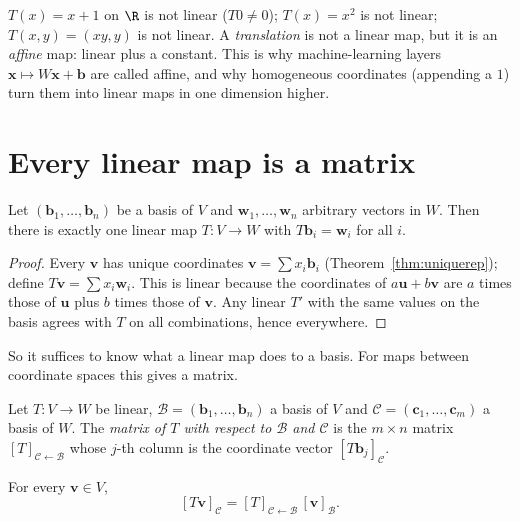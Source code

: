 \begin{example}
$T(x)=x+1$ on $\R$ is not linear ($T0\ne0$); $T(x)=x^2$ is not linear; $T(x,y)=(xy,y)$ is not linear. A \emph{translation} is not a linear map, but it is an \emph{affine} map: linear plus a constant. This is why machine-learning layers $\mathbf{x}\mapsto W\mathbf{x}+\mathbf{b}$ are called affine, and why homogeneous coordinates (appending a $1$) turn them into linear maps in one dimension higher.
\end{example}

\section{Every linear map is a matrix}

\begin{theorem}\label{thm:linbasis}
Let $(\mathbf{b}_1,\dots,\mathbf{b}_n)$ be a basis of $V$ and $\mathbf{w}_1,\dots,\mathbf{w}_n$ arbitrary vectors in $W$. Then there is exactly one linear map $T:V\to W$ with $T\mathbf{b}_i=\mathbf{w}_i$ for all $i$.
\end{theorem}

\begin{proof}
Every $\mathbf{v}$ has unique coordinates $\mathbf{v}=\sum x_i\mathbf{b}_i$ (Theorem~\ref{thm:uniquerep}); define $T\mathbf{v}=\sum x_i\mathbf{w}_i$. This is linear because the coordinates of $a\mathbf{u}+b\mathbf{v}$ are $a$ times those of $\mathbf{u}$ plus $b$ times those of $\mathbf{v}$. Any linear $T'$ with the same values on the basis agrees with $T$ on all combinations, hence everywhere.
\end{proof}

So it suffices to know what a linear map does to a basis. For maps between coordinate spaces this gives a matrix.

\begin{definition}
Let $T:V\to W$ be linear, $\mathcal{B}=(\mathbf{b}_1,\dots,\mathbf{b}_n)$ a basis of $V$ and $\mathcal{C}=(\mathbf{c}_1,\dots,\mathbf{c}_m)$ a basis of $W$. The \emph{matrix of $T$ with respect to $\mathcal{B}$ and $\mathcal{C}$} is the $m\times n$ matrix $[T]_{\mathcal{C}\leftarrow\mathcal{B}}$ whose $j$-th column is the coordinate vector $[T\mathbf{b}_j]_{\mathcal{C}}$.
\end{definition}

\begin{theorem}\label{thm:matrixrep}
For every $\mathbf{v}\in V$,
\[ [T\mathbf{v}]_{\mathcal{C}}=[T]_{\mathcal{C}\leftarrow\mathcal{B}}\,[\mathbf{v}]_{\mathcal{B}}. \]
\end{theorem}

